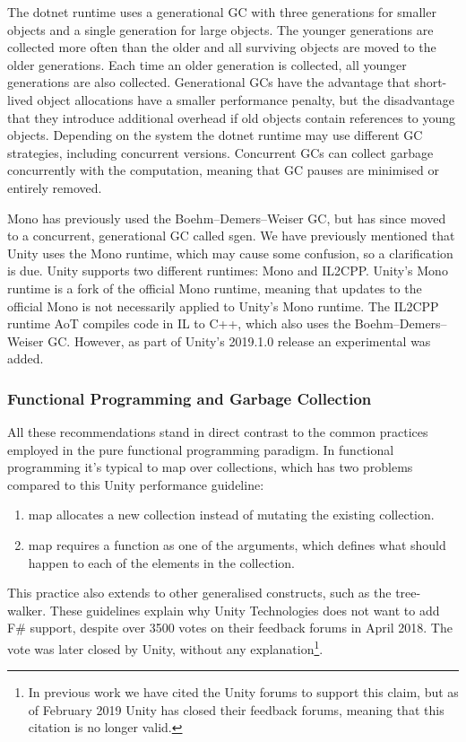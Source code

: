 The dotnet runtime uses a generational \gls{GC} with three generations for smaller objects and a single generation for large objects\cite{dotnet:gc}. The younger generations are collected more often than the older and all surviving objects are moved to the older generations. Each time an older generation is collected, all younger generations are also collected. Generational \glspl{GC} have the advantage that short-lived object allocations have a smaller performance penalty, but the disadvantage that they introduce additional overhead if old objects contain references to young objects\cite{sestoft2017programming}. Depending on the system the dotnet runtime may use different \gls{GC} strategies, including concurrent versions\cite{dotnet:gc}. Concurrent \glspl{GC} can collect garbage concurrently with the computation, meaning that \gls{GC} pauses are minimised or entirely removed\cite{dotnet:gc}.

Mono has previously used the Boehm–Demers–Weiser \gls{GC}, but has since moved to a concurrent, generational \gls{GC} called sgen\cite{mono:gc}. We have previously mentioned that Unity uses the Mono runtime, which may cause some confusion, so a clarification is due. Unity supports two different runtimes: Mono and IL2CPP. Unity's Mono runtime is a fork of the official Mono runtime\cite{unity:mono:github}, meaning that updates to the official Mono is not necessarily applied to Unity's Mono runtime. The IL2CPP runtime \gls{AoT} compiles code in \gls{IL} to C++, which also uses the Boehm–Demers–Weiser \gls{GC}\cite{il2cpp:gc}. However, as part of Unity's 2019.1.0 release an experimental \textit{} was added\cite{unity:roadmap}.

\subsubsection{Functional Programming and Garbage Collection}\label{sec:func-garbage}
All these recommendations stand in direct contrast to the common practices employed in the pure functional programming paradigm. In functional programming it's typical to map over collections, which has two problems compared to this Unity performance guideline:
\begin{enumerate}
    \item map allocates a new collection instead of mutating the existing collection.
    \item map requires a function as one of the arguments, which defines what should happen to each of the elements in the collection.
\end{enumerate}
This practice also extends to other generalised constructs, such as the tree-walker\cite{normark2008mapping}. These guidelines explain why Unity Technologies does not want to add F\# support, despite over 3500 votes on their feedback forums in April 2018\cite{unity:fsharp}. The vote was later closed by Unity, without any explanation\footnote{In previous work we have cited the Unity forums to support this claim\cite{p92018gameplay}, but as of February 2019 Unity has closed their feedback forums, meaning that this citation is no longer valid.}.

